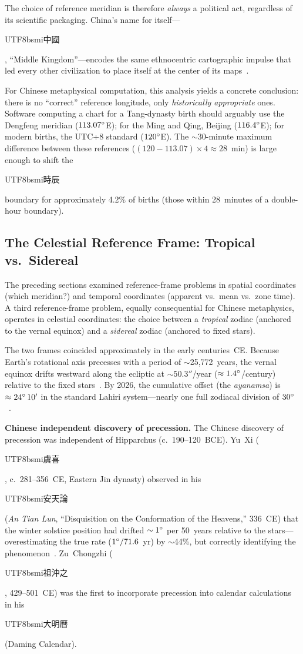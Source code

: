 \documentclass[10pt,a4paper]{article}
\newcommand{\zh}[1]{\begin{CJK}{UTF8}{bsmi}#1\end{CJK}}
\begin{document}
\noindent
The choice of reference meridian is therefore \emph{always} a political
act, regardless of its scientific packaging. China's name for
itself---\zh{中國}, ``Middle Kingdom''---encodes the same ethnocentric
cartographic impulse that led every other civilization to place itself
at the center of its maps~\cite{harley1987}.

For Chinese metaphysical computation, this analysis yields a concrete
conclusion: there is no ``correct'' reference longitude, only
\emph{historically appropriate} ones. Software computing a chart for
a Tang-dynasty birth should arguably use the Dengfeng meridian
($113.07\degree$E); for the Ming and Qing, Beijing ($116.4\degree$E);
for modern births, the UTC+8 standard ($120\degree$E). The $\sim 30$-minute
maximum difference between these references
($(120 - 113.07) \times 4 \approx 28$~min) is large enough to shift
the \zh{時辰} boundary for approximately 4.2\% of births
(those within 28~minutes of a double-hour boundary).

\subsection{The Celestial Reference Frame: Tropical vs.\ Sidereal}
\label{subsec:tropical_sidereal}

The preceding sections examined reference-frame problems in spatial
coordinates (which meridian?) and temporal coordinates (apparent vs.\
mean vs.\ zone time).  A third reference-frame problem, equally
consequential for Chinese metaphysics, operates in celestial
coordinates: the choice between a \emph{tropical} zodiac (anchored to
the vernal equinox) and a \emph{sidereal} zodiac (anchored to fixed
stars).

The two frames coincided approximately in the early centuries~CE.
Because Earth's rotational axis precesses with a period of
$\sim$25,772~years, the vernal equinox drifts westward along the
ecliptic at $\sim 50.3''$/year ($\approx 1.4\degree$/century) relative
to the fixed stars~\cite{needham1959}.  By 2026, the cumulative offset
(the \emph{ayanamsa}) is $\approx 24\degree\,10'$ in the standard
Lahiri system---nearly one full zodiacal division of
$30\degree$~\cite{chandra_hari_1998}.

\textbf{Chinese independent discovery of precession.}
The Chinese discovery of precession was independent of Hipparchus
(c.~190--120~BCE).  Yu~Xi (\zh{虞喜}, c.~281--356~CE, Eastern Jin
dynasty) observed in his \zh{安天論} (\textit{An Tian Lun},
``Disquisition on the Conformation of the Heavens,'' 336~CE) that the
winter solstice position had drifted $\sim 1\degree$ per 50~years
relative to the stars---overestimating the true rate
($1\degree/71.6$~yr) by $\sim$44\%, but correctly identifying the
phenomenon~\cite{needham1959, hockey_bea_2014}.  Zu~Chongzhi
(\zh{祖沖之}, 429--501~CE) was the first to incorporate precession into
calendar calculations in his \zh{大明曆} (Daming Calendar).
\end{document}
